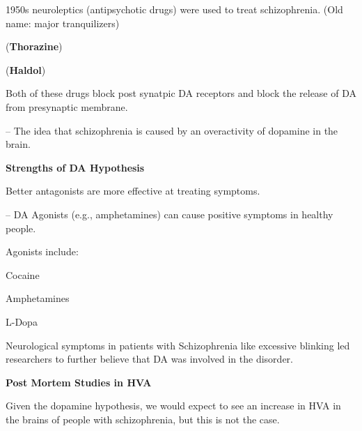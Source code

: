 \begin{coloredlist}
    \item 1950s neuroleptics (antipsychotic drugs) were used to treat schizophrenia. (Old name: major tranquilizers)
    \begin{coloredlist}
        \item {} (\textbf{Thorazine})
        \item {} (\textbf{Haldol})
        \item Both of these drugs block post synatpic DA receptors and block the release of DA from presynaptic membrane.
        \item {} -- The idea that schizophrenia is caused by an overactivity of dopamine in the brain.
        \begin{coloredlist}
            \item \textbf{Strengths of DA Hypothesis}
            \begin{coloredlist}
                \item Better antagonists are more effective at treating symptoms.
                \item {} -- DA Agonists (e.g., amphetamines) can cause positive symptoms in healthy people.
                \begin{coloredlist}
                    \item Agonists include:
                    \begin{coloredlist}
                        \item Cocaine
                        \item Amphetamines
                        \item L-Dopa
                    \end{coloredlist}
                \end{coloredlist}
                \item Neurological symptoms in patients with Schizophrenia like excessive blinking led researchers to further believe that DA was involved in the disorder.
            \end{coloredlist}
            \item \textbf{Post Mortem Studies in HVA}
            \begin{coloredlist}
                \item Given the dopamine hypothesis, we would expect to see an increase in HVA in the brains of people with schizophrenia, but this is not the case.

\end{coloredlist}
\end{coloredlist}
\end{coloredlist}
\end{coloredlist}
